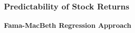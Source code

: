 \documentclass{beamer}
\begin{document}

	\begin{frame}
		\frametitle{Predictability of Stock Returns}
				\framesubtitle{Fama-MacBeth Regression Approach}	

\begin{table}[htbp]
  \centering
  \vspace*{-0.2cm}
	  \resizebox{0.65\textwidth}{!}{	 	
	 
}
\end{table}
\end{frame}
\end{document}
